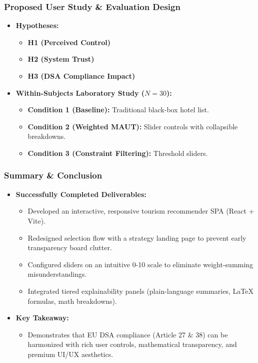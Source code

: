 \PraesentationMasterStandard
\begin{frame}
    \frametitle{Proposed User Study \& Evaluation Design}
    \begin{itemize}
        \item \textbf{Hypotheses:}
            \begin{itemize}
                \item \textbf{H1 (Perceived Control)}
                \item \textbf{H2 (System Trust)}
                \item \textbf{H3 (DSA Compliance Impact)}
            \end{itemize}
        \item \textbf{Within-Subjects Laboratory Study ($N=30$):}
            \begin{itemize}
                \item \textbf{Condition 1 (Baseline):} Traditional black-box hotel list.
                \item \textbf{Condition 2 (Weighted MAUT):} Slider controls with collapsible breakdowns.
                \item \textbf{Condition 3 (Constraint Filtering):} Threshold sliders.
            \end{itemize}
    \end{itemize}
\end{frame}



\begin{frame}
    \frametitle{Summary \& Conclusion}
    \begin{itemize}
        \item \textbf{Successfully Completed Deliverables:}
            \begin{itemize}
                \item Developed an interactive, responsive tourism recommender SPA (React + Vite).
                \item Redesigned selection flow with a strategy landing page to prevent early transparency board clutter.
                \item Configured sliders on an intuitive 0-10 scale to eliminate weight-summing misunderstandings.
                \item Integrated tiered explainability panels (plain-language summaries, LaTeX formulas, math breakdowns).
            \end{itemize}
        \item \textbf{Key Takeaway:}
            \begin{itemize}
                \item Demonstrates that EU DSA compliance (Article 27 \& 38) can be harmonized with rich user controls, mathematical transparency, and premium UI/UX aesthetics.
            \end{itemize}
    \end{itemize}
\end{frame}

